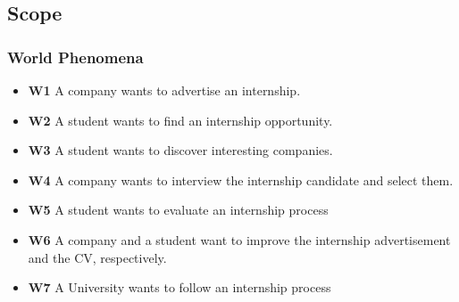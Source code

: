 \documentclass{article}
\begin{document}
\subsection{Scope}
\subsubsection{World Phenomena}
    \begin{itemize}
        \item \textbf{W1} A company wants to advertise an internship. 
        \item \textbf{W2} A student wants to find an internship opportunity.
        \item \textbf{W3} A student wants to discover interesting companies.
        \item \textbf{W4} A company wants to interview the internship candidate and select them.
        \item \textbf{W5} A student wants to evaluate an internship process
        \item \textbf{W6} A company and a student want to improve the internship advertisement and the CV, respectively.
        \item \textbf{W7} A University wants to follow an internship process
    \end{itemize}
\end{document}
